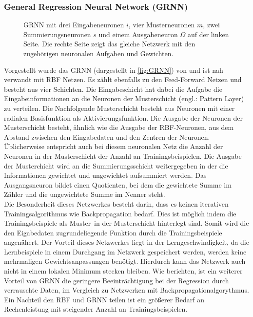 \subsubsection{General Regression Neural Network (GRNN)}
\begin{figure}[!htb]
    \centering
        
    \caption{GRNN mit drei Eingabeneuronen $i$, vier Musterneuronen $m$, zwei Summierungsneuronen $s$ und einem Ausgabeneuron $\Omega$  auf der linken Seite. Die rechte Seite zeigt das gleiche Netzwerk mit den zugehörigen neuronalen Aufgaben und Gewichten.}
    \label{fig:GRNN}
\end{figure}

Vorgestellt wurde das GRNN (dargestellt in \autoref{fig:GRNN}) von \citet{Specht1991} und ist nah verwandt mit RBF Netzen. Es zählt ebenfalls zu den Feed-Forward Netzen und besteht aus vier Schichten. Die Eingabeschicht hat dabei die Aufgabe die Eingabeinformationen an die Neuronen der Musterschicht (engl.: Pattern Layer) zu verteilen. Die Nachfolgende Musterschicht besteht aus Neuronen mit einer radialen Basisfunktion als Aktivierungsfunktion. Die Ausgabe der Neuronen der Musterschicht besteht, ähnlich wie die Ausgabe der RBF-Neuronen, aus dem Abstand zwischen den Eingabedaten und den Zentren der Neuronen. Üblicherweise entspricht auch bei diesem neuronalen Netz die Anzahl der Neuronen in der Musterschicht der Anzahl an Trainingsbeispielen. Die Ausgabe der Musterchicht wird an die Summierungsschicht weitergegeben in der die Informationen gewichtet und ungewichtet aufsummiert werden. Das Ausgangsneuron bildet einen Quotienten, bei dem die gewichtete Summe im Zähler und die ungewichtete Summe im Nenner steht.\\
Die Besonderheit dieses Netzwerkes besteht darin, dass es keinen iterativen Trainingsalgorithmus wie Backpropagation bedarf. Dies ist möglich indem die Trainingsbeispiele als \glqq Muster\grqq~in der Musterschicht hinterlegt sind. Somit wird die den Eigabedaten zugrundeliegende Funktion durch die Trainingsbeispiele angenähert. %
Der Vorteil dieses Netzwerkes liegt in der Lerngeschwindigkeit, da die Lernbeispiele in einem Durchgang im Netzwerk gespeichert werden, werden keine mehrmaligen Gewichtsanpassungen benötigt. Hierdurch kann das Netzwerk auch nicht in einem lokalen Minimum stecken bleiben. Wie \citet{Marqueza1993} berichten, ist ein weiterer Vorteil von GRNN die geringere Beeinträchtigung bei der Regression durch verrauschte Daten, im Vergleich zu Netzwerken mit Backpropagationalgorythmus.
Ein Nachteil den RBF und GRNN teilen ist ein größerer Bedarf an Rechenleistung mit steigender Anzahl an Trainingsbeispielen.  


